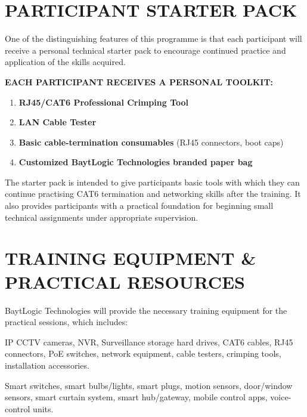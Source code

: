 \documentclass[11pt,a4paper]{article}
\begin{document}
\section{PARTICIPANT STARTER PACK}
One of the distinguishing features of this programme is that each participant will receive a personal technical starter pack to encourage continued practice and application of the skills acquired.

\begin{tcolorbox}[themebox]
\textbf{\Large EACH PARTICIPANT RECEIVES A PERSONAL TOOLKIT:}\\[6pt]
\begin{enumerate}[label=\bfseries\color{baytblue}\arabic*.]
    \color{white}
    \item \textbf{RJ45/CAT6 Professional Crimping Tool}
    \item \textbf{LAN Cable Tester}
    \item \textbf{Basic cable-termination consumables} (RJ45 connectors, boot caps)
    \item \textbf{Customized BaytLogic Technologies branded paper bag}
\end{enumerate}
\end{tcolorbox}

\noindent The starter pack is intended to give participants basic tools with which they can continue practising CAT6 termination and networking skills after the training. It also provides participants with a practical foundation for beginning small technical assignments under appropriate supervision.

\section{TRAINING EQUIPMENT \& PRACTICAL RESOURCES}
BaytLogic Technologies will provide the necessary training equipment for the practical sessions, which includes:

\begin{description}[style=multiline, leftmargin=3.8cm]
    \item[CCTV Equipment:] IP CCTV cameras, NVR, Surveillance storage hard drives, CAT6 cables, RJ45 connectors, PoE switches, network equipment, cable testers, crimping tools, installation accessories.
    \item[Smart Home Devices:] Smart switches, smart bulbs/lights, smart plugs, motion sensors, door/window sensors, smart curtain system, smart hub/gateway, mobile control apps, voice-control units.
\end{description}
\end{document}
